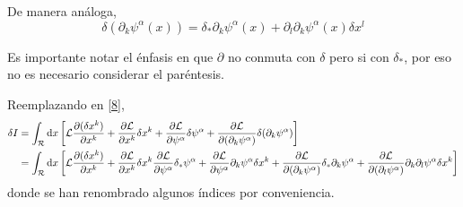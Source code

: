 De manera análoga,
\begin{equation}
  \delta (\partial_k\psi^\alpha(x))=\delta_*\partial_k\psi^\alpha (x)+\partial_l\partial_k\psi^\alpha (x)\delta x^l
\end{equation}

Es importante notar el énfasis en que $\partial$ no conmuta con $\delta$ pero si con $\delta_*$, por eso no es necesario considerar el paréntesis.

Reemplazando en \eqref{8},
\begin{align*}
  \delta I&=\int_{\mathcal{R}}\dd x\left[\mathcal{L} \pdv{(\delta x^k)}{x^k}+\pdv{\mathcal{L}}{x^k}\delta x^k+\pdv{\mathcal{L}}{\psi^\alpha}\delta\psi^\alpha+\pdv{\mathcal{L}}{(\partial_k\psi^\alpha)}\delta(\partial_k\psi^\alpha)\right]\\
  &=\int_{\mathcal{R}} \dd x\left[\mathcal{L} \pdv{(\delta x^k)}{x^k}+\pdv{\mathcal{L}}{x^k}\delta x^k\pdv{\mathcal{L}}{\psi^\alpha }\delta_*\psi^\alpha +\pdv{\mathcal{L}}{\psi^\alpha}\partial_k\psi^\alpha \delta x^k+\pdv{\mathcal{L}}{(\partial_k\psi^\alpha)}\delta_*\partial_k\psi^\alpha +\pdv{\mathcal{L}}{(\partial_l\psi^\alpha)}\partial_k\partial_l\psi^\alpha \delta x^k\right]
\end{align*}
donde se han renombrado algunos índices por conveniencia.


